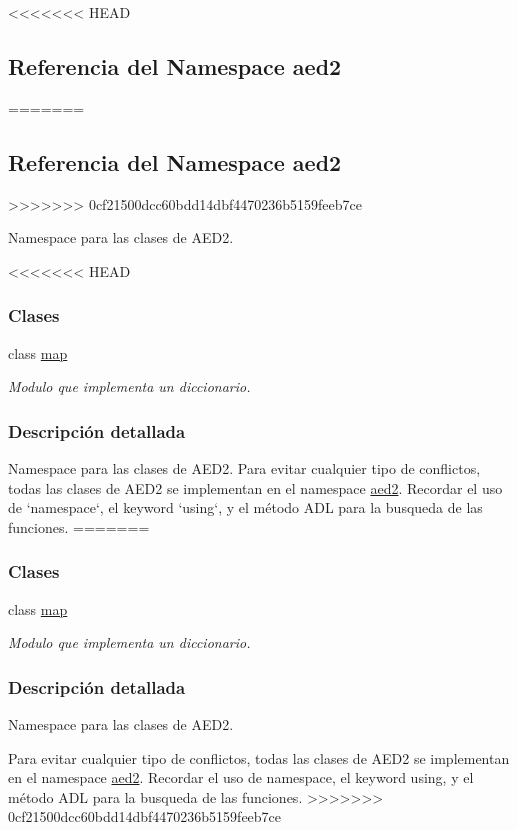 <<<<<<< HEAD
\hypertarget{namespaceaed2}{\subsection{\-Referencia del \-Namespace aed2}
=======
\hypertarget{namespaceaed2}{}\subsection{Referencia del Namespace aed2}
>>>>>>> 0cf21500dcc60bdd14dbf4470236b5159feeb7ce
\label{namespaceaed2}
}


\-Namespace para las clases de \-A\-E\-D2.  


<<<<<<< HEAD
\subsubsection*{\-Clases}
\begin{DoxyCompactItemize}
\item 
class \hyperlink{classaed2_1_1map}{map}
\begin{DoxyCompactList}\small\item\em \-Modulo que implementa un diccionario. \end{DoxyCompactList}\end{DoxyCompactItemize}


\subsubsection{\-Descripción detallada}
\-Namespace para las clases de \-A\-E\-D2. \-Para evitar cualquier tipo de conflictos, todas las clases de \-A\-E\-D2 se implementan en el namespace \hyperlink{namespaceaed2}{aed2}. \-Recordar el uso de `namespace`, el keyword `using`, y el método \-A\-D\-L para la busqueda de las funciones. 
=======
\subsubsection*{Clases}
\begin{DoxyCompactItemize}
\item 
class \hyperlink{classaed2_1_1map}{map}
\begin{DoxyCompactList}\small\item\em Modulo que implementa un diccionario. \end{DoxyCompactList}\end{DoxyCompactItemize}


\subsubsection{Descripción detallada}
Namespace para las clases de A\+E\+D2. 

Para evitar cualquier tipo de conflictos, todas las clases de A\+E\+D2 se implementan en el namespace \hyperlink{namespaceaed2}{aed2}. Recordar el uso de {\ttfamily namespace}, el keyword {\ttfamily using}, y el método A\+DL para la busqueda de las funciones. 
>>>>>>> 0cf21500dcc60bdd14dbf4470236b5159feeb7ce
